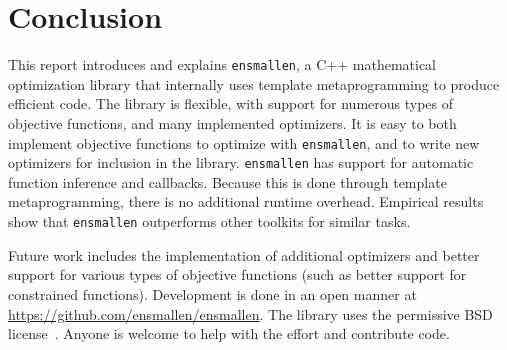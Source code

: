 \section{Conclusion}
\label{sec:conclusion}

This report introduces and explains {\tt ensmallen}, a C++ mathematical
optimization library that internally uses template metaprogramming to produce efficient
code.  The library is flexible, with support for numerous types of objective
functions, and many implemented optimizers.  It is easy to both implement
objective functions to optimize with {\tt ensmallen}, and to write new
optimizers for inclusion in the library.  {\tt ensmallen} has support for
automatic function inference and callbacks.  Because this is done through
template metaprogramming, there is no additional runtime overhead.
Empirical results show that {\tt ensmallen} outperforms other toolkits 
for similar tasks.

Future work includes the implementation of additional optimizers
and better support for various types of objective functions
(such as better support for constrained functions).
Development is done in an open manner at \mbox{\url{https://github.com/ensmallen/ensmallen}}.
The library uses the permissive BSD license~\cite{Laurent_2008}.
Anyone is welcome to help with the effort and contribute code.
